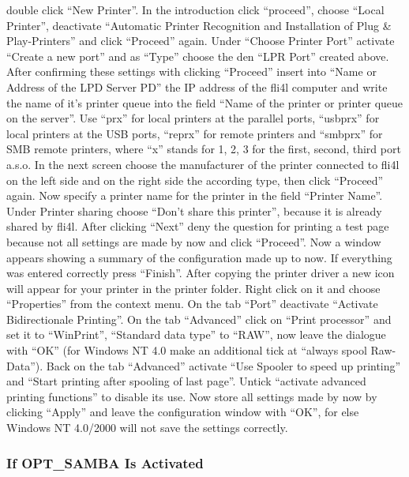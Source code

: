 \begin{enumerate}
  double click ``New Printer''. In the introduction click ``proceed'', choose
  ``Local Printer'', deactivate ``Automatic Printer Recognition and Installation
  of Plug \& Play-Printers'' and click ``Proceed'' again. Under ``Choose Printer Port''
  activate ``Create a new port'' and as ``Type'' choose the den ``LPR Port''
  created above. After confirming these settings with clicking ``Proceed''
  insert into ``Name or Address of the LPD Server PD'' the IP address of the
  fli4l computer and write the name of it's printer queue into the field
  ``Name of the printer or printer queue on the server''. Use ``prx'' for local
  printers at the parallel ports, ``usbprx'' for local printers at the USB ports,
  ``reprx'' for remote printers and ``smbprx'' for SMB remote printers, where
  ``x'' stands for 1, 2, 3 for the first, second, third port a.s.o.
  In the next screen choose the manufacturer of the printer connected to fli4l
  on the left side and on the right side the according type, then click ``Proceed''
  again. Now specify a printer name for the printer in the field ``Printer Name''.
  Under Printer sharing choose ``Don't share this printer'', because it is already
  shared by fli4l. After clicking ``Next'' deny the question for printing a test page
  because not all settings are made by now and click ``Proceed''. Now a window
  appears showing a summary of the configuration made up to now. If everything
  was entered correctly press ``Finish''. After copying the printer driver a new
  icon will appear for your printer in the printer folder. Right click on it and
  choose ``Properties'' from the context menu. On the tab ``Port'' deactivate
  ``Activate Bidirectionale Printing''. On the tab ``Advanced'' click on ``Print
  processor'' and set it to ``WinPrint'', ``Standard data type'' to ``RAW'', now
  leave the dialogue with ``OK'' (for Windows NT 4.0 make an additional tick at
  ``always spool Raw-Data''). Back on the tab ``Advanced'' activate ``Use Spooler
  to speed up printing'' and ``Start printing after spooling of last page''.
  Untick ``activate advanced printing functions'' to disable its use. Now store
  all settings made by now by clicking ``Apply'' and leave the configuration
  window with ``OK'', for else Windows NT 4.0/2000 will not save the settings
  correctly.

\end{enumerate}
\subsubsection{If OPT\_SAMBA Is Activated}

